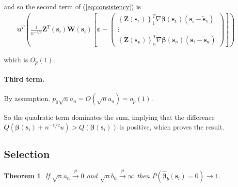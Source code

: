 \documentclass[authoryear, review, 11pt]{elsarticle}
\newtheorem{theorem}{Theorem}[section]
\begin{document}
  and so the second term of (\ref{eq:consistency}) is
  \begin{align*}
    \bm{u}^T \left( \frac{1}{n^{-1/2}} \bm{Z}^T(\bm{s}_i) \bm{W}(\bm{s}_i) \left[ \bm{\varepsilon} - \left( \begin{array}{c} \left\{ \bm{Z}(\bm{s}_1) \right\}^T_1  \nabla \bm{\beta}(\bm{s}_1) (\bm{s}_i - \tilde{\bm{s}}_1) \\ \vdots \\ \left\{ \bm{Z}(\bm{s}_n) \right\}^T_n \nabla \bm{\beta}(\bm{s}_n) (\bm{s}_i - \tilde{\bm{s}}_n) \end{array} \right)  \right] \right)
  \end{align*}
  
  which is $O_p(1)$.
  
  \paragraph{Third term.} By assumption, $p_0 \sqrt{n} a_n = O(\sqrt{n} a_n) = o_p(1)$.
  
  So the quadratic term dominates the sum, implying that the difference $Q \left( \bm{\beta}(\bm{s}_i) + n^{-1/2} u \right) > Q \left( \bm{\beta}(\bm{s}_i) \right)$ is positive, which proves the result.
  
  \subsection{Selection}
    
    \begin{theorem}\label{theorem:selection}   
      If $\sqrt{n} a_n \xrightarrow{p} 0$ and $\sqrt{n} b_n \xrightarrow{p} \infty$ then $P(\hat{\bm{\beta}}_b(\bm{s}_i) = 0) \to 1$.
    \end{theorem}
\end{document}

